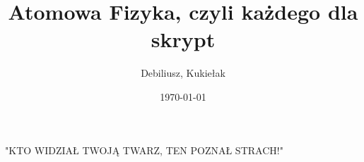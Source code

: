 \documentclass[a4paper,12pt]{article}
\title{Atomowa Fizyka, czyli każdego dla skrypt} %
\author{Debiliusz, Kukiełak} %
\date{\today} %
\begin{document}
	\maketitle
    "KTO WIDZIAŁ TWOJĄ TWARZ, TEN POZNAŁ STRACH!"
	
	
	
\end{document}
